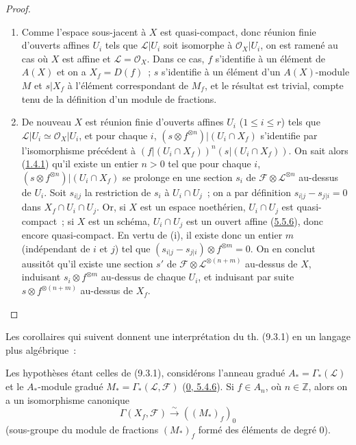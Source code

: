 \begin{proof}
\begin{enumerate}
\item[(i)] Comme l'espace sous-jacent à $X$ est quasi-compact, donc réunion
finie d'ouverts affines $U_i$ tels que $\mathscr{L}|U_i$ soit isomorphe à
$\mathscr{O}_X|U_i$, on est ramené au cas où $X$ est affine et
$\mathscr{L}=\mathscr{O}_X$. Dans ce cas, $f$ s'identifie à un élément de
$A(X)$ et on a $X_f=D(f)$~; $s$ s'identifie à un élément d'un
$A(X)$-module $M$ et $s|X_f$ à l'élément correspondant de $M_f$, et le
résultat est trivial, compte tenu de la définition d'un module de fractions.

\item[(ii)] De nouveau $X$ est réunion finie d'ouverts affines $U_i$
($1\leq i\leq r$) tels que $\mathscr{L}|U_i\simeq\mathscr{O}_X|U_i$, et pour
chaque $i$,
$(s\otimes f^{\otimes n})|(U_i\cap X_f)$ s'identifie par l'isomorphisme
précédent à
$(f|(U_i\cap X_f))^n(s|(U_i\cap X_f))$. On sait alors
(\hyperref[I.1.4.1-fr]{1.4.1}) qu'il existe un entier $n>0$ tel que pour
chaque $i$, $(s\otimes f^{\otimes n})|(U_i\cap X_f)$ se prolonge en une
section $s_i$ de $\mathscr{F}\otimes\mathscr{L}^{\otimes n}$ au-dessus de
$U_i$. Soit $s_{i|j}$ la restriction de $s_i$ à $U_i\cap U_j$~; on a par
définition $s_{i|j}-s_{j|i}=0$ dans $X_f\cap U_i\cap U_j$. Or, si $X$ est un
espace noethérien, $U_i\cap U_j$ est quasi-compact~; si $X$ est un schéma,
$U_i\cap U_j$ est un ouvert affine
(\hyperref[I.5.5.6-fr]{5.5.6}), donc encore quasi-compact. En vertu de (i),
il existe donc un entier $m$ (indépendant de $i$ et $j$) tel que
$(s_{i|j}-s_{j|i})\otimes f^{\otimes m}=0$. On en conclut aussitôt qu'il
existe une section $s'$ de
$\mathscr{F}\otimes\mathscr{L}^{\otimes(n+m)}$ au-dessus de $X$, induisant
$s_i\otimes f^{\otimes m}$ au-dessus de chaque $U_i$, et induisant par suite
$s\otimes f^{\otimes(n+m)}$ au-dessus de $X_f$.
\end{enumerate}
\end{proof}

Les corollaires qui suivent donnent une interprétation du th. (9.3.1) en un
langage plus algébrique~:

\begin{corollary}[9.3.2]
\label{I.9.3.2-fr}
Les hypothèses étant celles de (9.3.1), considérons l'anneau gradué
$A_* = \Gamma_*(\mathscr{L})$ et le $A_*$-module gradué
$M_* = \Gamma_*(\mathscr{L},\mathscr{F})$
(\hyperref[0.5.4.6-fr]{0, 5.4.6}). Si $f\in A_n$, où $n\in\mathbb{Z}$, alors
on a un isomorphisme canonique
\[
  \Gamma(X_f,\mathscr{F})\xrightarrow{\sim}((M_*)_f)_0
\]
(sous-groupe du module de fractions $(M_*)_f$ formé des éléments de degré
$0$).
\end{corollary}

